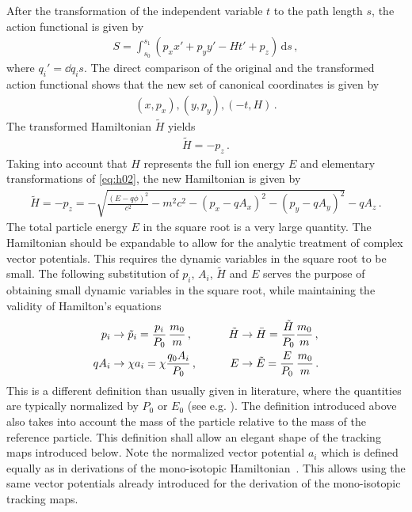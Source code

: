 %
%
After the transformation of the independent variable $t$ to the path length $s$, the action functional is given by
%
\begin{align}
  S = \int_{s_0}^{s_1} (p_x x' + p_y y' - H t' + p_z) \, \mathrm{d} s \, ,
\end{align}
where $q_i' = \dd{q_i}{s}$. The direct comparison of the original and the transformed action functional shows that the new set of canonical coordinates is given by
%
\begin{align}
  (x,p_x), (y,p_y), (-t,H) \, .
\end{align}
%
The transformed Hamiltonian $\tilde{H}$ yields
%
\begin{align}
  \tilde{H} = -p_z \, .
\end{align}
%
Taking into account that $H$ represents the full ion energy $E$ and elementary transformations of \eqref{eq:h02}, the new Hamiltonian is given by
%
\begin{align}
  \tilde{H} = -p_z = - \sqrt{ \frac{(E-q\phi)^2}{c^2} - m^2c^2 - (p_x - q A_x)^2 - (p_y -q  A_y)^2} - q  A_z \, .
\end{align}
The total particle energy $E$ in the square root is a very large quantity. The Hamiltonian should be expandable to allow for the analytic treatment of complex vector potentials. This requires the dynamic variables in the square root to be small.
\newpage
The following substitution of $p_i$, $A_i$, $\tilde{H}$ and $E$ serves the purpose of obtaining small dynamic variables in the square root, while maintaining the validity of Hamilton's equations
%
\begin{alignat}{4}
p_i &\rightarrow \tilde{p}_i = \frac{p_i}{P_0} \, \frac{m_0}{m}\, , \quad \quad &\tilde{H} &\rightarrow \bar{H} = \frac{\tilde{H}}{P_0}  \frac{m_0}{m} \, , \notag \\
q A_i &\rightarrow \chi a_i = \chi \frac{q_0 A_i}{P_0} \, , \quad \quad &E &\rightarrow \tilde{E} = \frac{E}{P_0} \, \frac{m_0}{m} \, . \label{eq:normalization_H}
\end{alignat}
%
This is a different definition than usually given in literature, where the quantities are typically normalized by $P_0$ or $E_0$ (see e.g. \cite{DESY-85-084}). The definition introduced above also takes into account the mass of the particle relative to the mass of the reference particle. This definition shall allow an elegant shape of the tracking maps introduced below. Note the normalized vector potential $a_i$ which is defined equally as in derivations of the mono-isotopic Hamiltonian~\cite{DESY-85-084}. This allows using the same vector potentials already introduced for the derivation of the mono-isotopic tracking maps.


